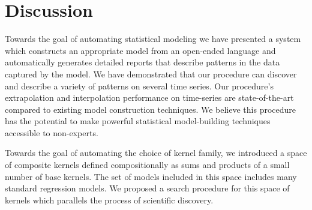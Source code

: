 \section{Discussion}

Towards the goal of automating statistical modeling we have presented a system which constructs an appropriate model from an open-ended language and automatically generates detailed reports that describe patterns in the data captured by the model.
We have demonstrated that our procedure can discover and describe a variety of patterns on several time series.
Our procedure's extrapolation and interpolation performance on time-series are state-of-the-art compared to existing model construction techniques.
We believe this procedure has the potential to make powerful statistical model-building techniques accessible to non-experts.

%



Towards the goal of automating the choice of kernel family, we introduced a space of composite kernels defined compositionally as sums and products of a small number of base kernels.  
The set of models included in this space includes many standard regression models.
We proposed a search procedure for this space of kernels which parallels the process of scientific discovery.

